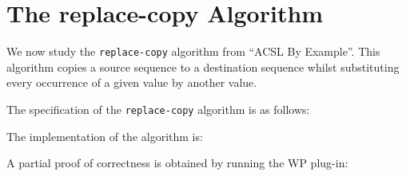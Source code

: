 \section{The \textsf{replace-copy} Algorithm}
\label{replace-copy}

We now study the \texttt{replace-copy} algorithm from ``ACSL By Example''.
This algorithm copies a source sequence to a destination sequence whilst
substituting every occurrence of a given value by another value.

The specification of the \texttt{replace-copy} algorithm is as follows:


The implementation of the algorithm is:


A partial proof of correctness is obtained by running the \textsf{WP} plug-in: 

